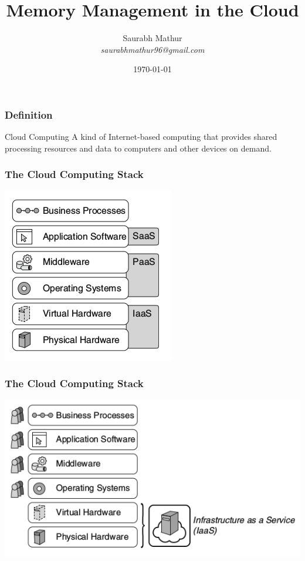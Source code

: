 \documentclass{beamer}
\title{Memory Management in the Cloud}
\author{Saurabh Mathur\\ 
\emph{saurabhmathur96@gmail.com}}
\institute{ SITE, VIT Vellore }
\date{\today}
\begin{document}
\begin{frame}
\maketitle
\end{frame}

\begin{frame}
\frametitle{Definition}
\begin{block}{Cloud Computing}
A kind of Internet-based computing that provides shared processing resources and data to computers and other devices on demand.
\end{block}
\end{frame}


\begin{frame}

\frametitle{The Cloud Computing Stack}
\begin{center}
\includegraphics[width=.5\textwidth]{stack}
\end{center}

\end{frame}

\begin{frame}

\frametitle{The Cloud Computing Stack}
\begin{center}
\includegraphics[width=\textwidth]{IaaS}
\end{center}

\end{frame}
\end{document}
